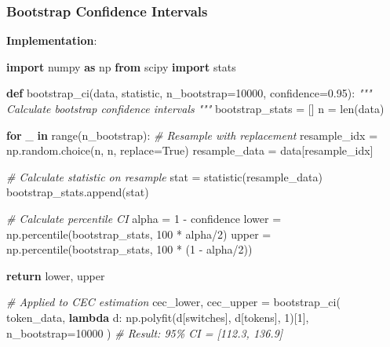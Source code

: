\documentclass[
  11pt]{article}
\newenvironment{Shaded}{}{}
\newcommand{\BuiltInTok}[1]{\textcolor[rgb]{0.00,0.50,0.00}{#1}}
\newcommand{\CommentTok}[1]{\textcolor[rgb]{0.38,0.63,0.69}{\textit{#1}}}
\newcommand{\ControlFlowTok}[1]{\textcolor[rgb]{0.00,0.44,0.13}{\textbf{#1}}}
\newcommand{\DecValTok}[1]{\textcolor[rgb]{0.25,0.63,0.44}{#1}}
\newcommand{\FloatTok}[1]{\textcolor[rgb]{0.25,0.63,0.44}{#1}}
\newcommand{\ImportTok}[1]{\textcolor[rgb]{0.00,0.50,0.00}{\textbf{#1}}}
\newcommand{\KeywordTok}[1]{\textcolor[rgb]{0.00,0.44,0.13}{\textbf{#1}}}
\newcommand{\NormalTok}[1]{#1}
\newcommand{\OperatorTok}[1]{\textcolor[rgb]{0.40,0.40,0.40}{#1}}
\newcommand{\StringTok}[1]{\textcolor[rgb]{0.25,0.44,0.63}{#1}}
\newcommand{\VariableTok}[1]{\textcolor[rgb]{0.10,0.09,0.49}{#1}}
\begin{document}
\subsubsection{Bootstrap Confidence
Intervals}\label{bootstrap-confidence-intervals}

\textbf{Implementation}:

\begin{Shaded}
\begin{Highlighting}[]
\ImportTok{import}\NormalTok{ numpy }\ImportTok{as}\NormalTok{ np}
\ImportTok{from}\NormalTok{ scipy }\ImportTok{import}\NormalTok{ stats}

\KeywordTok{def}\NormalTok{ bootstrap\_ci(data, statistic, n\_bootstrap}\OperatorTok{=}\DecValTok{10000}\NormalTok{, confidence}\OperatorTok{=}\FloatTok{0.95}\NormalTok{):}
    \CommentTok{"""}
\CommentTok{    Calculate bootstrap confidence intervals}
\CommentTok{    """}
\NormalTok{    bootstrap\_stats }\OperatorTok{=}\NormalTok{ []}
\NormalTok{    n }\OperatorTok{=} \BuiltInTok{len}\NormalTok{(data)}
    
    \ControlFlowTok{for}\NormalTok{ \_ }\KeywordTok{in} \BuiltInTok{range}\NormalTok{(n\_bootstrap):}
        \CommentTok{\# Resample with replacement}
\NormalTok{        resample\_idx }\OperatorTok{=}\NormalTok{ np.random.choice(n, n, replace}\OperatorTok{=}\VariableTok{True}\NormalTok{)}
\NormalTok{        resample\_data }\OperatorTok{=}\NormalTok{ data[resample\_idx]}
        
        \CommentTok{\# Calculate statistic on resample}
\NormalTok{        stat }\OperatorTok{=}\NormalTok{ statistic(resample\_data)}
\NormalTok{        bootstrap\_stats.append(stat)}
    
    \CommentTok{\# Calculate percentile CI}
\NormalTok{    alpha }\OperatorTok{=} \DecValTok{1} \OperatorTok{{-}}\NormalTok{ confidence}
\NormalTok{    lower }\OperatorTok{=}\NormalTok{ np.percentile(bootstrap\_stats, }\DecValTok{100} \OperatorTok{*}\NormalTok{ alpha}\OperatorTok{/}\DecValTok{2}\NormalTok{)}
\NormalTok{    upper }\OperatorTok{=}\NormalTok{ np.percentile(bootstrap\_stats, }\DecValTok{100} \OperatorTok{*}\NormalTok{ (}\DecValTok{1} \OperatorTok{{-}}\NormalTok{ alpha}\OperatorTok{/}\DecValTok{2}\NormalTok{))}
    
    \ControlFlowTok{return}\NormalTok{ lower, upper}

\CommentTok{\# Applied to CEC estimation}
\NormalTok{cec\_lower, cec\_upper }\OperatorTok{=}\NormalTok{ bootstrap\_ci(}
\NormalTok{    token\_data, }
    \KeywordTok{lambda}\NormalTok{ d: np.polyfit(d[}\StringTok{\textquotesingle{}switches\textquotesingle{}}\NormalTok{], d[}\StringTok{\textquotesingle{}tokens\textquotesingle{}}\NormalTok{], }\DecValTok{1}\NormalTok{)[}\DecValTok{1}\NormalTok{],}
\NormalTok{    n\_bootstrap}\OperatorTok{=}\DecValTok{10000}
\NormalTok{)}
\CommentTok{\# Result: 95\% CI = [112.3, 136.9]}
\end{Highlighting}
\end{Shaded}
\end{document}
